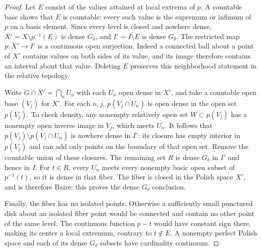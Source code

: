 \documentclass[11pt,letterpaper]{amsart}
\theoremstyle{definition}
\theoremstyle{remark}
\numberwithin{equation}{section}
\begin{document}
\begin{proof}
Let $E$ consist of the values attained at local extrema of $p$.
A countable base shows that $E$ is countable: every such value is
the supremum or infimum of $p$ on a basis element. Since every
level is closed and nowhere dense, $X'=X\setminus p^{-1}(E)$ is
dense $G_\delta$, and $I'=I\setminus E$ is dense $G_\delta$.
The restricted map $p:X'\to I'$ is a continuous open surjection.
Indeed a connected ball about a point of $X'$ contains values on
both sides of its value, and its image therefore contains an interval
about that value. Deleting $E$ preserves this neighborhood statement
in the relative topology.

Write $G\cap X'=\bigcap_nU_n$ with each $U_n$ open dense in $X'$,
and take a countable open base $(V_j)$ for $X'$. For each $n,j$,
$p(V_j\cap U_n)$ is open dense in the open set $p(V_j)$.
To check density, any nonempty relatively open set
$W\subset p(V_j)$ has a nonempty open inverse image in $V_j$,
which meets $U_n$. It follows that
$p(V_j)\setminus p(V_j\cap U_n)$ is nowhere dense in $I'$:
its closure has empty interior in $p(V_j)$ and can add only
points on the boundary of that open set. Remove the countable union
of these closures. The remaining set $R$ is dense $G_\delta$ in
$I'$ and hence in $I$. For $t\in R$, every $U_n$ meets every
nonempty basic open subset of $p^{-1}(t)$, so it is dense in that
fiber. The fiber is closed in the Polish space $X'$, and is therefore
Baire; this proves the dense $G_\delta$ conclusion.

Finally, the fiber has no isolated points. Otherwise a sufficiently
small punctured disk about an isolated fiber point would be connected
and contain no other point of the same level. The continuous function
$p-t$ would have constant sign there, making its center a local
extremum, contrary to $t\notin E$. A nonempty perfect Polish space
and each of its dense $G_\delta$ subsets have cardinality continuum.
\end{proof}
\end{document}
